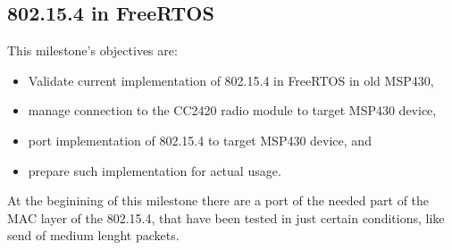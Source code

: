 

		\subsection{802.15.4 in FreeRTOS}
		\label{ssec:802.15.4.FreeRTOS}	
		This milestone's objectives are:
		\begin{itemize}
		\item Validate current implementation of 802.15.4 in FreeRTOS in old MSP430,
		\item manage connection to the CC2420 radio module to target MSP430 device,
		\item port implementation of 802.15.4 to target MSP430 device, and
		\item prepare such implementation for actual usage.
		\end{itemize}

		At the beginining of this milestone there are a port of the needed part of the MAC layer of the 802.15.4, that have been tested in just certain conditions, like send of medium lenght packets.\\

